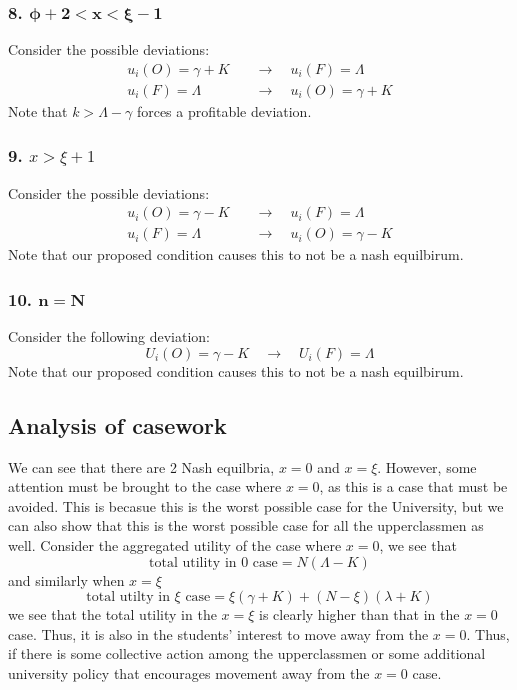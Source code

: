 \documentclass[12pt]{article}
\begin{document}
\subsubsection*{8. $\mathbf{\phi + 2 < x < \xi -1}$}
Consider the possible deviations:
\begin{align*}
    u_i(O) = \gamma + K \quad &\to \quad u_i(F) = \Lambda\\
    u_i(F) = \Lambda \quad &\to \quad u_i(O) = \gamma + K
\end{align*}
Note that $k > \Lambda - \gamma$ forces a profitable deviation. 
\subsubsection*{9. $x > \xi + 1$}
Consider the possible deviations:
\begin{align*}
    u_i(O) = \gamma - K \quad &\to \quad u_i(F) = \Lambda  \\
    u_i(F) = \Lambda \quad &\to \quad u_i(O) = \gamma - K
\end{align*}
Note that our proposed condition causes this to not be a nash equilbirum. 
\subsubsection*{10. $\mathbf{n = N}$}
Consider the following deviation:
\[
U_i(O) = \gamma - K \quad \to \quad  U_i(F) = \Lambda 
\]
Note that our proposed condition causes this to not be a nash equilbirum. 
\subsection{Analysis of casework}
We can see that there are 2 Nash equilbria, $x = 0$ and $x = \xi$. However, some attention must be brought to the case where $x = 0$, as this is a case that must be avoided. This is becasue this is the worst possible case for the University, but we can also show that this is the worst possible case for all the upperclassmen as well. Consider the aggregated utility of the case where $x = 0$, we see that 
\[
\text{total utility in 0 case} = N(\Lambda - K)
\]
and similarly when $x = \xi$
\[
\text{total utilty in } \xi \text{ case} = \xi(\gamma + K) + (N - \xi)(\lambda + K)
\]
we see that the total utility in the $x = \xi$ is clearly higher than that in the $x = 0$ case. Thus, it is also in the students' interest to move away from the $x = 0$. Thus, if there is some collective action among the upperclassmen or some additional university policy that encourages movement away from the $x = 0$ case.
\end{document}
